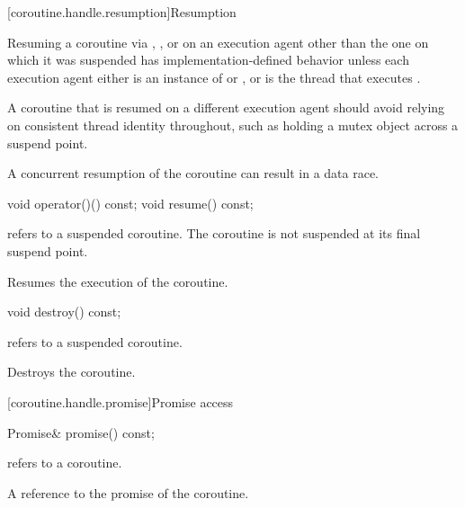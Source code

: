 [coroutine.handle.resumption]{Resumption}

\pnum
Resuming a coroutine via , , or 
on an execution agent other than the one on which it was suspended
has implementation-defined behavior unless
each execution agent either is
an instance of  or ,
or is the thread that executes .
\begin{note}
A coroutine that is resumed on a different execution agent should
avoid relying on consistent thread identity throughout, such as holding
a mutex object across a suspend point.
\end{note}
\begin{note}
A concurrent resumption of the coroutine can result in a data race.
\end{note}

%
%
\begin{itemdecl}
void operator()() const;
void resume() const;
\end{itemdecl}

\begin{itemdescr}
\pnum
\expects
{} refers to a suspended coroutine.
The coroutine is not suspended at its final suspend point.

\pnum
\effects
Resumes the execution of the coroutine.
\end{itemdescr}

%
\begin{itemdecl}
void destroy() const;
\end{itemdecl}

\begin{itemdescr}
\pnum
\expects
{} refers to a suspended coroutine.

\pnum
\effects
Destroys the coroutine.
\end{itemdescr}

[coroutine.handle.promise]{Promise access}

%
\begin{itemdecl}
Promise& promise() const;
\end{itemdecl}

\begin{itemdescr}
\pnum
\expects
{} refers to a coroutine.

\pnum
\returns
A reference to the promise of the coroutine.
\end{itemdescr}


